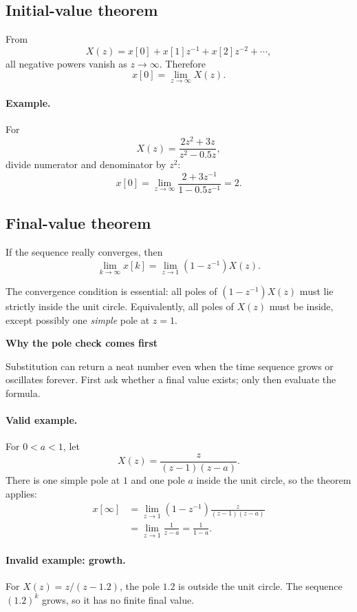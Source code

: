 \documentclass[11pt]{article}
\newenvironment{keybox}[1]
  {\begin{center}\begin{lrbox}{\notebox}\begin{minipage}{0.91\linewidth}\small\textbf{#1}\par\smallskip}
  {\end{minipage}\end{lrbox}\fcolorbox{blue!55!black}{blue!4}{\usebox{\notebox}}\end{center}}
\begin{document}
\subsection{Initial-value theorem}

From
\[
X(z)=x[0]+x[1]z^{-1}+x[2]z^{-2}+\cdots,
\]
all negative powers vanish as $z\to\infty$. Therefore
\[
x[0]=\lim_{z\to\infty}X(z).
\]

\paragraph{Example.}
For
\[
X(z)=\frac{2z^2+3z}{z^2-0.5z},
\]
divide numerator and denominator by $z^2$:
\[
x[0]=\lim_{z\to\infty}
\frac{2+3z^{-1}}{1-0.5z^{-1}}=2.
\]

\subsection{Final-value theorem}

If the sequence really converges, then
\[
\lim_{k\to\infty}x[k]
=\lim_{z\to1}(1-z^{-1})X(z).
\]

The convergence condition is essential: all poles of $(1-z^{-1})X(z)$ must lie strictly inside the unit circle. Equivalently, all poles of $X(z)$ must be inside, except possibly one \emph{simple} pole at $z=1$.

\begin{keybox}{Why the pole check comes first}
Substitution can return a neat number even when the time sequence grows or oscillates forever. First ask whether a final value exists; only then evaluate the formula.
\end{keybox}

\paragraph{Valid example.}
For $0<a<1$, let
\[
X(z)=\frac{z}{(z-1)(z-a)}.
\]
There is one simple pole at $1$ and one pole $a$ inside the unit circle, so the theorem applies:
\begin{align*}
x[\infty]
&=\lim_{z\to1}(1-z^{-1})\frac{z}{(z-1)(z-a)}\\
&=\lim_{z\to1}\frac{1}{z-a}
=\frac{1}{1-a}.
\end{align*}

\paragraph{Invalid example: growth.}
For $X(z)=z/(z-1.2)$, the pole $1.2$ is outside the unit circle. The sequence $(1.2)^k$ grows, so it has no finite final value.
\end{document}
